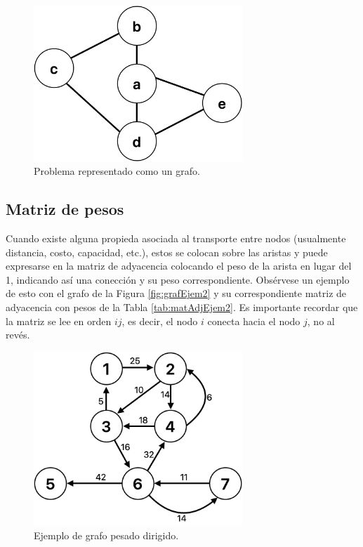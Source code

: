 \documentclass[12pt]{article}  %
\begin{document}
\begin{figure}[H]
\centering
\caption{Problema representado como un grafo.}
\label{fig:grafEjem}
\includegraphics[width=0.7\textwidth]{assets/grafoEjemploAdj.png}
\end{figure}

\subsection{Matriz de pesos}
Cuando existe alguna propieda asociada al transporte entre nodos (usualmente distancia, costo, capacidad, etc.), estos se colocan sobre las aristas y puede expresarse en la matriz de adyacencia colocando el peso de la arista en lugar del 1, indicando así una conección y su peso correspondiente. Obsérvese un ejemplo de esto con el grafo de la Figura \ref{fig:grafEjem2} y su correspondiente matriz de adyacencia con pesos de la Tabla \ref{tab:matAdjEjem2}.
Es importante recordar que la matriz se lee en orden $ij$, es decir, el nodo $i$ conecta hacia el nodo $j$, no al revés.

\begin{figure}[H]
\centering
\caption{Ejemplo de grafo pesado dirigido.}
\label{fig:grafEjem}
\includegraphics[width=0.7\textwidth]{assets/grafEjem2.png}
\end{figure}
\end{document}
